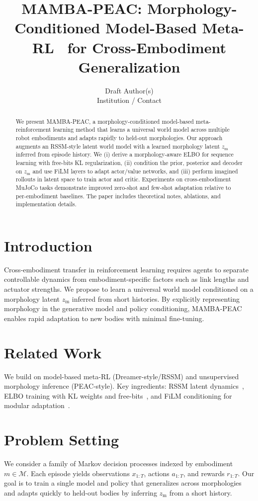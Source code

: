 \documentclass{article}
\title{MAMBA-PEAC: Morphology-Conditioned Model-Based Meta-RL \ for Cross-Embodiment Generalization}
\author{Draft Author(s)\\
Institution / Contact\\
}
\begin{document}
\maketitle

\begin{abstract}
We present MAMBA-PEAC, a morphology-conditioned model-based meta-reinforcement learning method that learns a universal world model across multiple robot embodiments and adapts rapidly to held-out morphologies. Our approach augments an RSSM-style latent world model with a learned morphology latent $z_{\mathrm{m}}$ inferred from episode history. We (i) derive a morphology-aware ELBO for sequence learning with free-bits KL regularization, (ii) condition the prior, posterior and decoder on $z_{\mathrm{m}}$ and use FiLM layers to adapt actor/value networks, and (iii) perform imagined rollouts in latent space to train actor and critic. Experiments on cross-embodiment MuJoCo tasks demonstrate improved zero-shot and few-shot adaptation relative to per-embodiment baselines. The paper includes theoretical notes, ablations, and implementation details.
\end{abstract}

\section{Introduction}
Cross-embodiment transfer in reinforcement learning requires agents to separate controllable dynamics from embodiment-specific factors such as link lengths and actuator strengths. We propose to learn a universal world model conditioned on a morphology latent $z_{\mathrm{m}}$ inferred from short histories. By explicitly representing morphology in the generative model and policy conditioning, MAMBA-PEAC enables rapid adaptation to new bodies with minimal fine-tuning.

\section{Related Work}
We build on model-based meta-RL (Dreamer-style/RSSM) and unsupervised morphology inference (PEAC-style). Key ingredients: RSSM latent dynamics~\cite{hafner2020dreamer}, ELBO training with KL weights and free-bits~\cite{kingma2013, Higgins2017betaVAE}, and FiLM conditioning for modular adaptation~\cite{perez2018film}.

\section{Problem Setting}
We consider a family of Markov decision processes indexed by embodiment $m\in\mathcal{M}$. Each episode yields observations $x_{1:T}$, actions $a_{1:T}$, and rewards $r_{1:T}$. Our goal is to train a single model and policy that generalizes across morphologies and adapts quickly to held-out bodies by inferring $z_{\mathrm{m}}$ from a short history.
\end{document}
